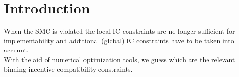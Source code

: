 

\section{Introduction}  
When the SMC is violated the local IC constraints are no longer sufficient for implementability
and additional (global) IC constraints have to be taken into account.\\
With the aid of numerical optimization tools, we guess which are the relevant binding incentive compatibility constraints.
       
